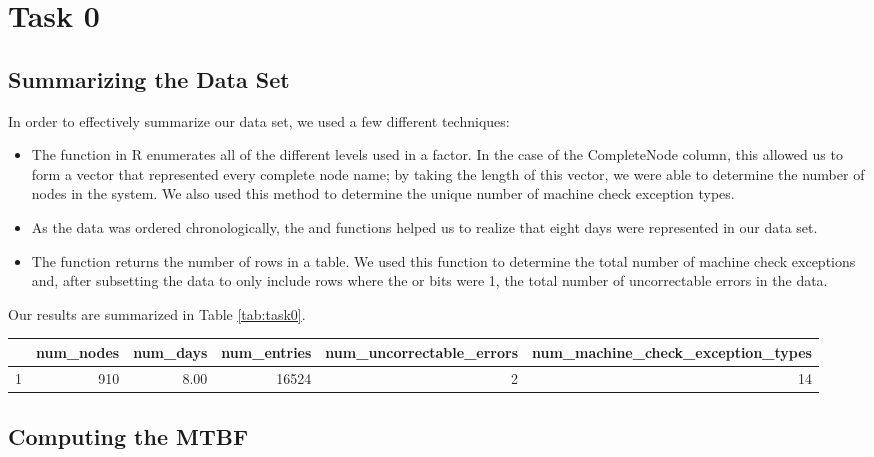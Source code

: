 \section{Task 0}

\subsection{Summarizing the Data Set}
In order to effectively summarize our data set, we used a few different techniques:

\begin{itemize}
\item The  function in R enumerates all of the different levels used in a factor.  In the case of the CompleteNode column, this allowed us to form a vector that represented every complete node name; by taking the length of this vector, we were able to determine the number of nodes in the system.  We also used this method to determine the unique number of machine check exception types.
\item As the data was ordered chronologically, the  and  functions helped us to realize that eight days were represented in our data set.
\item The  function returns the number of rows in a table.  We used this function to determine the total number of machine check exceptions and, after subsetting the data to only include rows where the  or  bits were 1, the total number of uncorrectable errors in the data.
\end{itemize}

Our results are summarized in Table \ref{tab:task0}.

\begin{table*}
\centering
\begin{tabular}{rrrrrr}
  \hline
 & num\_nodes & num\_days & num\_entries & num\_uncorrectable\_errors & num\_machine\_check\_exception\_types \\ 
  \hline
1 & 910 & 8.00 & 16524 &   2 &  14 \\ 
   \hline
\end{tabular}
\caption{Results from Task0 node counts and MTBF}\label{tab:task0}
\end{table*}

\subsection{Computing the MTBF}

